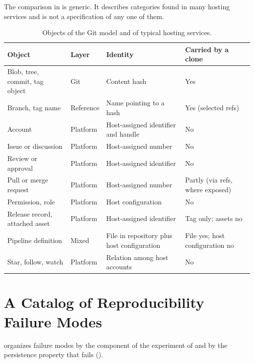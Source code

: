 \documentclass[11pt,twoside,openright]{book}
\theoremstyle{plain}
\theoremstyle{definition}
\theoremstyle{remark}
\begin{document}
The comparison in  is generic. It describes categories found in many hosting services and is not a specification of any one of them.

\begin{table}[h]
\centering
\caption{Objects of the Git model and of typical hosting services.}
\label{tab:objcompare}
\small
\begin{tabular}{p{}p{}p{}p{}}
\toprule
Object & Layer & Identity & Carried by a clone \\
\midrule
Blob, tree, commit, tag object & Git & Content hash & Yes \\
Branch, tag name & Reference & Name pointing to a hash & Yes (selected refs) \\
Account & Platform & Host-assigned identifier and handle & No \\
Issue or discussion & Platform & Host-assigned number & No \\
Review or approval & Platform & Host-assigned identifier & No \\
Pull or merge request & Platform & Host-assigned number & Partly (via refs, where exposed) \\
Permission, role & Platform & Host configuration & No \\
Release record, attached asset & Platform & Host-assigned identifier & Tag only; assets no \\
Pipeline definition & Mixed & File in repository plus host configuration & File yes; host configuration no \\
Star, follow, watch & Platform & Relation among host accounts & No \\
\bottomrule
\end{tabular}
\end{table}

\chapter{A Catalog of Reproducibility Failure Modes}\label{app:failure}

 organizes failure modes by the component of the experiment of  and by the persistence property that fails ().
\end{document}
